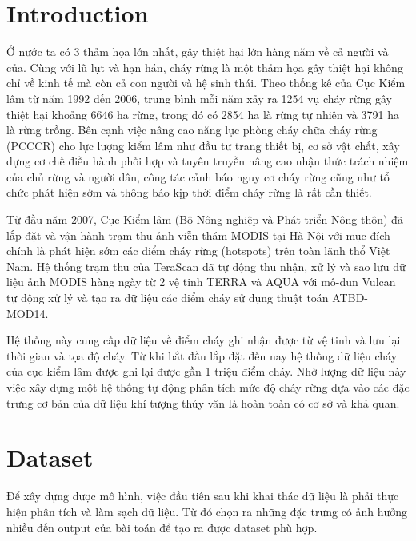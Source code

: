 \documentclass{article}
\begin{document}
\section{Introduction}

\qquad Ở nước ta có 3 thảm họa lớn nhất, gây thiệt hại lớn hàng năm về cả người và của. Cùng với lũ lụt và hạn hán, cháy rừng là một thảm họa gây thiệt hại không chỉ về kinh tế mà còn cả con người và hệ sinh thái. Theo thống kê của Cục Kiểm lâm từ năm 1992 đến 2006, trung bình mỗi năm xảy ra 1254 vụ cháy rừng gây thiệt hại khoảng 6646 ha rừng, trong đó có 2854 ha là rừng tự nhiên và 3791 ha là rừng trồng. Bên cạnh việc nâng cao năng lực phòng cháy chữa cháy rừng (PCCCR) cho lực lượng kiểm lâm như đầu tư trang thiết bị, cơ sở vật chất, xây dựng cơ chế điều hành phối hợp và tuyên truyền nâng cao nhận thức trách nhiệm của chủ rừng và người dân, công tác cảnh báo nguy cơ cháy rừng cũng như tổ chức phát hiện sớm và thông báo kịp thời điểm cháy rừng là rất cần thiết.

Từ đầu năm 2007, Cục Kiểm lâm (Bộ Nông nghiệp và Phát triển Nông thôn) đã lắp đặt và vận hành trạm thu ảnh viễn thám MODIS tại Hà Nội với mục đích chính là phát hiện sớm các điểm cháy rừng (hotspots) trên toàn lãnh thổ Việt Nam. Hệ thống trạm thu của TeraScan đã tự động thu nhận, xử lý và sao lưu dữ liệu ảnh MODIS hàng ngày từ 2 vệ tinh TERRA và AQUA với mô-đun Vulcan tự động xử lý và tạo ra dữ liệu các điểm cháy sử dụng thuật toán ATBD-MOD14.

Hệ thống này cung cấp dữ liệu về điểm cháy ghi nhận được từ vệ tinh và lưu lại thời gian và tọa độ cháy. Từ khi bắt đầu lắp đặt đến nay hệ thống dữ liệu cháy của cục kiểm lâm được ghi lại được gần 1 triệu điểm cháy. Nhờ lượng dữ liệu này việc xây dựng một hệ thống tự động phân tích mức độ cháy rừng dựa vào các đặc trưng cơ bản của dữ liệu khí tượng thủy văn là hoàn toàn có cơ sở và khả quan.


\section{Dataset}

\qquad Để xây dựng dược mô hình, việc đầu tiên sau khi khai thác dữ liệu là phải thực hiện phân tích và làm sạch dữ liệu. Từ đó chọn ra những đặc trưng có ảnh hưởng nhiều đến output của bài toán để tạo ra được dataset phù hợp.
\end{document}
